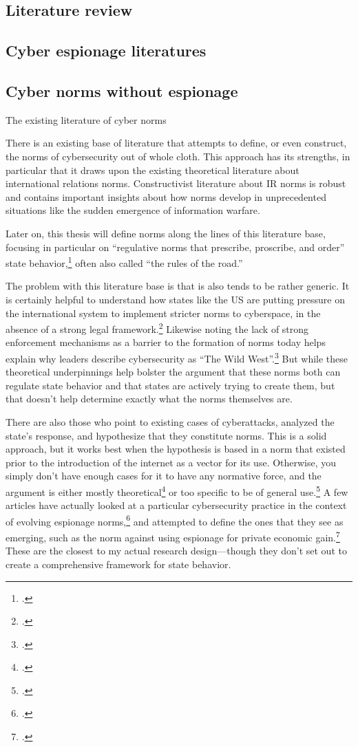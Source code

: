\documentclass{memoir}
\begin{document}
\begin{refsegment}
\section{Literature review}
\subsection{Cyber espionage literatures}

\subsection{Cyber norms without espionage}
The existing literature of cyber norms

There is an existing base of literature that attempts to define, or even construct, the norms of cybersecurity out of whole cloth. This approach has its strengths, in particular that it draws upon the existing theoretical literature about international relations norms. Constructivist literature about IR norms is robust and contains important insights about how norms develop in unprecedented situations like the sudden emergence of information warfare.

Later on, this thesis will define norms along the lines of this literature base, focusing in particular on ``regulative norms that prescribe, proscribe, and order'' state behavior,\footcite{bjorkdahl_norms_2002} often also called ``the rules of the road.''

The problem with this literature base is that is also tends to be rather generic. It is certainly helpful to understand how states like the US are putting pressure on the international system to implement stricter norms to cyberspace, in the absence of a strong legal framework.\footcite[~p.7]{finnemore_constructing_2016} Likewise noting the lack of strong enforcement mechanisms as a barrier to the formation of norms today helps explain why leaders describe cybersecurity as ``The Wild West''.\footcite{iasiello_what_2016} But while these theoretical underpinnings help bolster the argument that these norms both can regulate state behavior and that states are actively trying to create them, but that doesn't help determine exactly what the norms themselves are.

There are also those who point to existing cases of cyberattacks, analyzed the state's response, and hypothesize that they constitute norms. This is a solid approach, but it works best when the hypothesis is based in a norm that existed prior to the introduction of the internet as a vector for its use. Otherwise, you simply don't have enough cases for it to have any normative force, and the argument is either mostly theoretical\footcite{neutze_cyber_2013} or too specific to be of general use.\footcite{caso_rules_2014} A few articles have actually looked at a particular cybersecurity practice in the context of evolving espionage norms,\footcite{libicki_coming_2017} and attempted to define the ones that they see as emerging, such as the norm against using espionage for private economic gain.\footcite{rascoff_norm_2016} These are the closest to my actual research design---though they don't set out to create a comprehensive framework for state behavior.


\end{refsegment}
\end{document}
